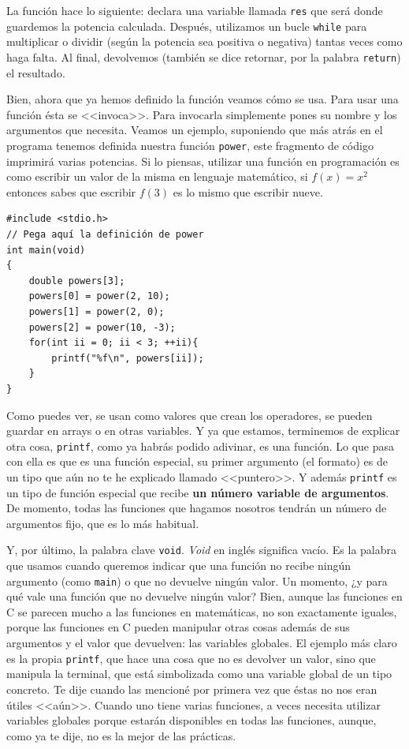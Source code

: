 \documentclass[a4paper]{article}
\begin{document}
La función hace lo siguiente: declara una variable llamada \verb!res! que será
donde guardemos la potencia calculada. Después, utilizamos un bucle \verb!while!
para multiplicar o dividir (según la potencia sea positiva o negativa) tantas
veces como haga falta. Al final, devolvemos (también se dice retornar, por la
palabra \verb!return!) el resultado.

Bien, ahora que ya hemos definido la función veamos cómo se usa. Para usar una
función ésta se <<invoca>>. Para invocarla simplemente pones su nombre y los
argumentos que necesita. Veamos un ejemplo, suponiendo que más atrás en el
programa tenemos definida nuestra función \verb!power!,
este fragmento de código imprimirá varias potencias. Si lo piensas, utilizar
una función en programación es como escribir un valor de la misma en lenguaje
matemático, si $f(x) = x^2$ entonces sabes que escribir $f(3)$ es lo mismo que
escribir nueve.


\noindent
\begin{minipage}[H]{\linewidth}
\mbox{}
\begin{lstlisting}[style=C, label={lst:functionInvocation},
caption={Invocación de función en C}]
#include <stdio.h>
// Pega aquí la definición de power
int main(void)
{
    double powers[3];
    powers[0] = power(2, 10);
    powers[1] = power(2, 0);
    powers[2] = power(10, -3);
    for(int ii = 0; ii < 3; ++ii){
        printf("%f\n", powers[ii]);
    }
}
\end{lstlisting}
\end{minipage}


Como puedes ver, se usan como valores que crean los operadores,
se pueden guardar en arrays o en otras
variables. Y ya que estamos, terminemos de explicar otra cosa, \verb!printf!,
como ya habrás podido adivinar, es una función. Lo que pasa con ella es que
es una función especial, su primer argumento (el formato) es de un tipo que
aún no te he explicado llamado <<puntero>>. Y además \verb!printf! es un
tipo de función especial que recibe \textbf{un número variable de argumentos}.
De momento, todas las funciones que hagamos nosotros tendrán un número de
argumentos fijo, que es lo más habitual.

Y, por último, la palabra clave \lstinline[style=C]{void}. \textit{Void} en
inglés significa vacío. Es la palabra que usamos cuando queremos indicar que
una función no recibe ningún argumento (como \verb!main!) o que no devuelve
ningún valor. Un momento, ¿y para qué vale una función que no devuelve ningún
valor? Bien, aunque las funciones en C se parecen mucho a las funciones en
matemáticas, no son exactamente iguales, porque las funciones en C pueden
manipular otras cosas además de sus argumentos y el valor que devuelven:
las variables globales.
El ejemplo más claro es la propia \verb!printf!, que hace una cosa que no es
devolver un valor, sino que manipula la terminal, que está simbolizada como una
variable global de un tipo concreto. Te dije cuando las mencioné por primera vez
que éstas no nos eran útiles <<aún>>. Cuando uno tiene varias funciones, a veces
necesita utilizar variables globales porque estarán disponibles en todas las
funciones, aunque, como ya te dije, no es la mejor de las prácticas.
\end{document}
